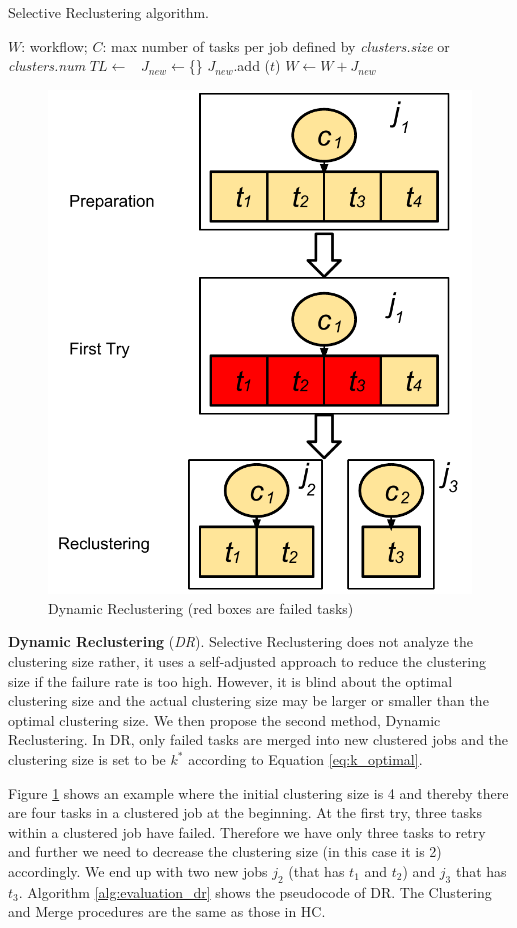 \documentclass{IOS-Book-Article}
\begin{document}
\begin{algorithm}[!htb]
	\footnotesize
	\caption{Selective Reclustering algorithm. }
	\label{alg:evaluation_sr}
	\begin{algorithmic}[1]
		\Require $W$: workflow; $C$: max number of tasks per job defined by \emph{clusters.size} or \emph{clusters.num}
			\State $TL \gets$\ 
			\State $J_{new}\gets$\{\}
					\State $J_{new}$.add ($t$)
				\EndIf
			\EndFor
			\State $W \gets W + J_{new}$ 
		\EndProcedure
	\end{algorithmic}
\end{algorithm}

 

\begin{figure}[!htb]
\centering
  \includegraphics[width=0.45\linewidth]{dr.pdf}
  \caption{Dynamic Reclustering (red boxes are failed tasks)}
  \label{fig:clustering_dr}
\end{figure}

\textbf{Dynamic Reclustering} (\emph{DR}). 
Selective Reclustering does not analyze the clustering size rather, it uses a self-adjusted approach to reduce the clustering size if the failure rate is too high. However, it is blind about the optimal clustering size and the actual clustering size may be larger or smaller than the optimal clustering size. We then propose the second method, Dynamic Reclustering. In DR, only failed tasks are merged into new clustered jobs and the clustering size is set to be $k^*$ according to Equation \ref{eq:k_optimal}.



Figure \ref{fig:clustering_dr} shows an example where the initial clustering size is 4 and thereby there are four tasks in a clustered job at the beginning. At the first try, three tasks within a clustered job have failed. Therefore we have only three tasks to retry and further we need to decrease the clustering size (in this case it is 2) accordingly. We end up with two new jobs $j_2$ (that has $t_1$ and $t_2$) and $j_3$ that has $t_3$. Algorithm \ref{alg:evaluation_dr} shows the pseudocode of DR. The Clustering and Merge procedures are the same as those in HC. 
\end{document}
